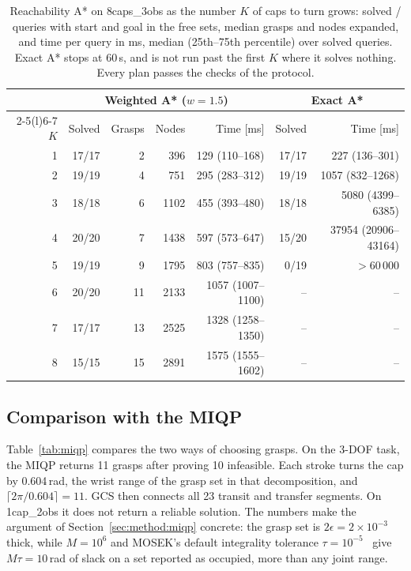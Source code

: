 \begin{table}[t]
\centering
\caption{Reachability A* on \textsf{8caps\_3obs} as the number $K$ of caps to
turn grows: solved / queries with start and goal in the free sets, median
grasps and nodes expanded, and time per query in ms, median (25th--75th
percentile) over solved queries. Exact A* stops at 60\,s, and is not run past
the first $K$ where it solves nothing. Every plan passes the checks of the
protocol.}
\label{tab:cap_scaling}
\setlength{\tabcolsep}{2.6pt}
\begin{tabular}{@{}r r r r r r r@{}}
\toprule
 & \multicolumn{4}{c}{Weighted A* ($w=1.5$)} & \multicolumn{2}{c}{Exact A*}\\
\cmidrule(lr){2-5}\cmidrule(l){6-7}
$K$ & Solved & Grasps & Nodes & Time [ms] & Solved & Time [ms]\\
\midrule
1 & 17/17 & 2 & 396 & 129 (110--168) & 17/17 & 227 (136--301)\\
2 & 19/19 & 4 & 751 & 295 (283--312) & 19/19 & 1057 (832--1268)\\
3 & 18/18 & 6 & 1102 & 455 (393--480) & 18/18 & 5080 (4399--6385)\\
4 & 20/20 & 7 & 1438 & 597 (573--647) & 15/20 & 37954 (20906--43164)\\
5 & 19/19 & 9 & 1795 & 803 (757--835) & 0/19 & $>$60\,000\\
6 & 20/20 & 11 & 2133 & 1057 (1007--1100) & -- & --\\
7 & 17/17 & 13 & 2525 & 1328 (1258--1350) & -- & --\\
8 & 15/15 & 15 & 2891 & 1575 (1555--1602) & -- & --\\
\bottomrule
\end{tabular}
\end{table}

\subsection{Comparison with the MIQP}
Table~\ref{tab:miqp} compares the two ways of choosing grasps. On the 3-DOF
task, the MIQP returns 11 grasps after proving 10 infeasible. Each stroke
turns the cap by 0.604\,rad, the wrist range of the grasp set in that
decomposition, and $\lceil 2\pi/0.604\rceil=11$. GCS then connects all 23
transit and transfer segments. On \textsf{1cap\_2obs} it does not return a
reliable solution. The numbers make the argument of
Section~\ref{sec:method:miqp} concrete: the grasp set is
$2\epsilon=2\times10^{-3}$ thick, while $M=10^{6}$ and MOSEK's default
integrality tolerance $\tau=10^{-5}$~\cite{mosek} give $M\tau=10$\,rad of
slack on a set reported as occupied, more than any joint range.

